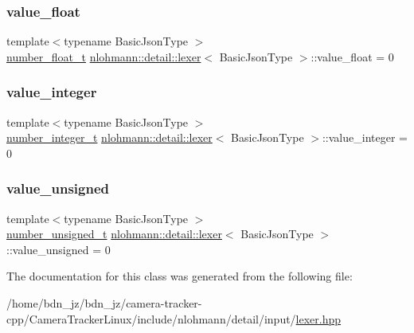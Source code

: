 \subsubsection{\texorpdfstring{value\+\_\+float}{value\_float}}
{\footnotesize\ttfamily template$<$typename Basic\+Json\+Type $>$ \\
\hyperlink{classnlohmann_1_1detail_1_1lexer_aa7f9e7b2bcd311fb86e2da43761a6619}{number\+\_\+float\+\_\+t} \hyperlink{classnlohmann_1_1detail_1_1lexer}{nlohmann\+::detail\+::lexer}$<$ Basic\+Json\+Type $>$\+::value\+\_\+float = 0\hspace{0.3cm}{\ttfamily [private]}}

\mbox{\label{classnlohmann_1_1detail_1_1lexer_a353d8eeca5b2f21b3e88540c17afb9bc}} 
\subsubsection{\texorpdfstring{value\+\_\+integer}{value\_integer}}
{\footnotesize\ttfamily template$<$typename Basic\+Json\+Type $>$ \\
\hyperlink{classnlohmann_1_1detail_1_1lexer_a9cd1b11cc67edbfb2613c788b5bd337c}{number\+\_\+integer\+\_\+t} \hyperlink{classnlohmann_1_1detail_1_1lexer}{nlohmann\+::detail\+::lexer}$<$ Basic\+Json\+Type $>$\+::value\+\_\+integer = 0\hspace{0.3cm}{\ttfamily [private]}}

\mbox{\label{classnlohmann_1_1detail_1_1lexer_af250180459c23ca71c3e10a99fb5ba3e}} 
\subsubsection{\texorpdfstring{value\+\_\+unsigned}{value\_unsigned}}
{\footnotesize\ttfamily template$<$typename Basic\+Json\+Type $>$ \\
\hyperlink{classnlohmann_1_1detail_1_1lexer_a105d1dfeab414a572655895cdd96a52a}{number\+\_\+unsigned\+\_\+t} \hyperlink{classnlohmann_1_1detail_1_1lexer}{nlohmann\+::detail\+::lexer}$<$ Basic\+Json\+Type $>$\+::value\+\_\+unsigned = 0\hspace{0.3cm}{\ttfamily [private]}}



The documentation for this class was generated from the following file\+:\begin{DoxyCompactItemize}
\item 
/home/bdn\+\_\+jz/bdn\+\_\+jz/camera-\/tracker-\/cpp/\+Camera\+Tracker\+Linux/include/nlohmann/detail/input/\hyperlink{lexer_8hpp}{lexer.\+hpp}\end{DoxyCompactItemize}
